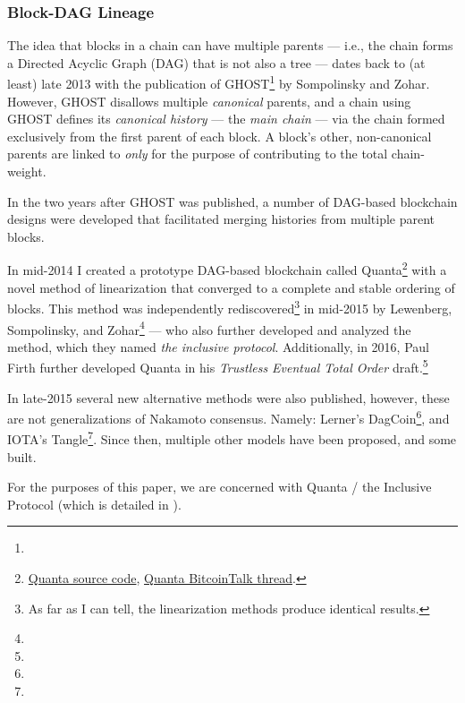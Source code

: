 
\hypertarget{block-dag-lineage}{%
\subsubsection{Block-DAG Lineage}\label{block-dag-lineage}}

\label{sec:block-dag-lineage}

The idea that blocks in a chain can have multiple parents --- i.e., the chain forms a Directed Acyclic Graph (DAG) that is not also a tree --- dates back to (at least) late 2013 with the publication of GHOST\footnote{
    \citeGhostFull{}
} by Sompolinsky and Zohar.
However, GHOST disallows multiple \emph{canonical} parents, and a chain using GHOST defines its \emph{canonical history} --- the \emph{main chain} --- via the chain formed exclusively from the first parent of each block.
A block's other, non-canonical parents are linked to \emph{only} for the purpose of contributing to the total chain-weight.

In the two years after GHOST was published, a number of DAG-based blockchain designs were developed that facilitated merging histories from multiple parent blocks.

In mid-2014 I created a prototype DAG-based blockchain called
Quanta\footnote{
    \href{https://github.com/XertroV/quanta-test/blob/ba598d5fe89d3b16db07533957a2080edb19a9cd/quanta.py\#L157}{Quanta source code},
    \href{https://bitcointalk.org/index.php?topic=1057342}{Quanta BitcoinTalk thread}.
} with a novel method of linearization that converged to a complete and stable ordering of blocks.
This method was independently rediscovered\footnote{
    As far as I can tell, the linearization methods produce identical results.
} in mid-2015 by Lewenberg, Sompolinsky, and Zohar\footnote{\citeInclusiveFull{}} --- who also further developed and analyzed the method, which they named \emph{the inclusive protocol}.
Additionally, in 2016, Paul Firth further developed Quanta in his \emph{Trustless Eventual Total Order} draft.\footnote{\citeTetoLink{}}

In late-2015 several new alternative methods were also published, however, these are not generalizations of Nakamoto consensus.
Namely:
Lerner's DagCoin\footnote{
  \citeDagcoinLink{}
}, and IOTA's Tangle\footnote{
  \citeIotaTalkLink{}
}.
Since then, multiple other models have been proposed, and some built.

For the purposes of this paper, we are concerned with Quanta / the Inclusive Protocol (which is detailed in \citeInclusiveFull{}).
